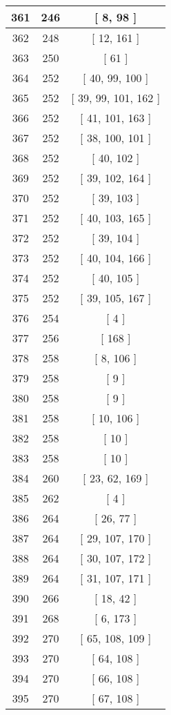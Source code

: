 \begin{center}
\begin{longtable}[H]{|| c c c ||}
\hline
361 & 246 & [ 8, 98 ] \\ 
\hline
362 & 248 & [ 12, 161 ] \\ 
\hline
363 & 250 & [ 61 ] \\ 
\hline
364 & 252 & [ 40, 99, 100 ] \\ 
\hline
365 & 252 & [ 39, 99, 101, 162 ] \\ 
\hline
366 & 252 & [ 41, 101, 163 ] \\ 
\hline
367 & 252 & [ 38, 100, 101 ] \\ 
\hline
368 & 252 & [ 40, 102 ] \\ 
\hline
369 & 252 & [ 39, 102, 164 ] \\ 
\hline
370 & 252 & [ 39, 103 ] \\ 
\hline
371 & 252 & [ 40, 103, 165 ] \\ 
\hline
372 & 252 & [ 39, 104 ] \\ 
\hline
373 & 252 & [ 40, 104, 166 ] \\ 
\hline
374 & 252 & [ 40, 105 ] \\ 
\hline
375 & 252 & [ 39, 105, 167 ] \\ 
\hline
376 & 254 & [ 4 ] \\ 
\hline
377 & 256 & [ 168 ] \\ 
\hline
378 & 258 & [ 8, 106 ] \\ 
\hline
379 & 258 & [ 9 ] \\ 
\hline
380 & 258 & [ 9 ] \\ 
\hline
381 & 258 & [ 10, 106 ] \\ 
\hline
382 & 258 & [ 10 ] \\ 
\hline
383 & 258 & [ 10 ] \\ 
\hline
384 & 260 & [ 23, 62, 169 ] \\ 
\hline
385 & 262 & [ 4 ] \\ 
\hline
386 & 264 & [ 26, 77 ] \\ 
\hline
387 & 264 & [ 29, 107, 170 ] \\ 
\hline
388 & 264 & [ 30, 107, 172 ] \\ 
\hline
389 & 264 & [ 31, 107, 171 ] \\ 
\hline
390 & 266 & [ 18, 42 ] \\ 
\hline
391 & 268 & [ 6, 173 ] \\ 
\hline
392 & 270 & [ 65, 108, 109 ] \\ 
\hline
393 & 270 & [ 64, 108 ] \\ 
\hline
394 & 270 & [ 66, 108 ] \\ 
\hline
395 & 270 & [ 67, 108 ] \\ 

\end{longtable}
\end{center}
